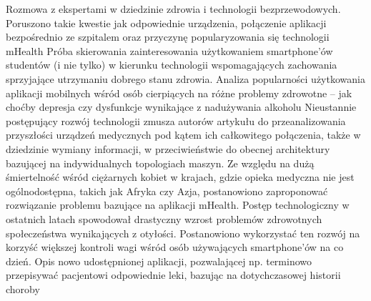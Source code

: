 \cite{Bi&t/AftAoMILogan2012ARoundtableDiscussion:EmbracingtheMobileRevolutionIndexMedicus} Rozmowa z ekspertami w dziedzinie zdrowia i technologii bezprzewodowych. Poruszono takie kwestie jak odpowiednie urządzenia, połączenie aplikacji bezpośrednio ze szpitalem oraz przyczynę popularyzowania się technologii mHealth
\cite{NEPSkiba2014TheConnectedAge:MobileAppsandConsumerEngagementSmartphonesInternetaccessFDAapprovalDiseasecontrolElectronichealthrecordsHumansInformationmanagementStudentsNursingConsumerParticipationPatientsTextmessagingSocialnetworksWomenshealthHospitalsPersonalhealthGlobalpositioningsystems--GPS} Próba skierowania zainteresowania użytkowaniem smartphone'ów studentów (i nie tylko) w kierunku technologii wspomagających zachowania sprzyjające utrzymaniu dobrego stanu zdrowia.
\cite{PDaTWerkmeister2013TheUseofApplicationsonMobileDevicesinaMidwesternPopulationClinicalpsychologyPsychology} Analiza popularności użytkowania aplikacji mobilnych wśród osób cierpiących na różne problemy zdrowotne – jak choćby depresja czy dysfunkcje wynikające z nadużywania alkoholu
\cite{BIFacchinetti2012ThisProcessIsJustBeginning:ConnectingMobileMedicalDevicesTelemedicineWirelessTechnologyTechnologicalchangeDeliveryofHealthCareComputerCommunicationNetworksSystemsIntegrationMedicalequipmentInformationtechnologySoftware} Nieustannie postępujący rozwój technologii zmusza autorów artykułu do przeanalizowania przyszłości urządzeń medycznych pod kątem ich całkowitego połączenia, także w dziedzinie wymiany informacji, w przeciwieństwie do obecnej architektury bazującej na indywidualnych topologiach maszyn.
\cite{Ismaeel2013EffectiveSystemforPregnantWomenusingMobileGIS} Ze względu na dużą śmiertelność wśród ciężarnych kobiet w krajach, gdzie opieka medyczna nie jest ogólnodostępna, takich jak Afryka czy Azja, postanowiono zaproponować rozwiązanie problemu bazujące na aplikacji mHealth.
\cite{CDRJ.GrahamThomas2014ReviewofInnovationsinDigitalHealthTechnologytoPromoteWeightControlScience&TechnologyLifeSciences&BiomedicineEndocrinology&MetabolismENDOCRINOLOGY&METABOLISMRANDOMIZED-CONTROLLED-TRIALPHYSICAL-ACTIVITYLOSSPROGRAMLOSSMAINTENANCEMOBILE-TECHNOLOGYOBESITYEPIDEMICECONOMICBURDENUNITED-STATESPRIMARY-CAREUSADULTS} Postęp technologiczny w ostatnich latach spowodował drastyczny wzrost problemów zdrowotnych społeczeństwa wynikających z otyłości. Postanowiono wykorzystać ten rozwój na korzyść większej kontroli wagi wśród osób używających smartphone'ów na co dzień.
\cite{FMottl2014mHealthappoffersround-the-clockmedicalconciergesubscriptionservice} Opis nowo udostępnionej aplikacji, pozwalającej np. terminowo przepisywać pacjentowi odpowiednie leki, bazując na dotychczasowej historii choroby
